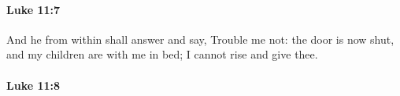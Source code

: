 		\paragraph{Luke 11:7} %
			\label{LUKE-11-7}

			And he from within shall answer and say, Trouble me not: the door is now shut, and my children are with me in bed; I cannot rise and give thee.

			\begin{framed}
			\scriptsize
				\begin{compactdesc}
					\item[SBLG] 
				\end{compactdesc}
			\end{framed}

		\paragraph{Luke 11:8} %
			\label{LUKE-11-8}

